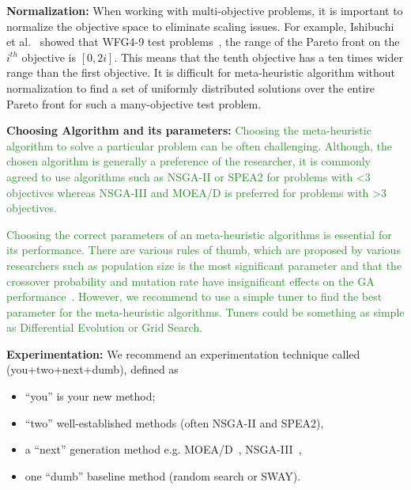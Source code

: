 \documentclass[sigconf,anonymous,review]{acmart}
\newcommand\TODO[1]{\textcolor{ScarletRed}{\textbf{\colorbox{yellow}{\small TODO:}} \emph{#1}}\xspace}
\newcommand\vivek[1]{\textcolor{ForestGreen}{#1\xspace}}
\begin{document}
  \noindent\textbf{Normalization: } When working with multi-objective problems, it is important to normalize the objective space to eliminate scaling issues. For example, Ishibuchi et al.~\cite{ishibuchi2017effect} showed that WFG4-9 test problems~\cite{huband2006review}, the range
of the Pareto front on the $i^{th}$ objective is $[0, 2i]$. This means
that the tenth objective has a ten times wider range than
the first objective. It is difficult for meta-heuristic algorithm without normalization
to find a set of uniformly distributed solutions over the entire Pareto front for such a many-objective test
problem. 

\noindent\textbf{Choosing Algorithm and its parameters: } \vivek{Choosing the meta-heuristic algorithm to solve a particular problem can be often challenging. Although, the chosen algorithm is generally a preference of the researcher, it is commonly agreed to use algorithms such as NSGA-II or SPEA2 for problems with <3 objectives whereas NSGA-III and MOEA/D is preferred for problems with >3 objectives.}

\vivek{Choosing the correct parameters of an meta-heuristic algorithms is essential for its performance. There are various rules of thumb, which are proposed by various researchers such as population size is the most significant parameter and that the crossover probability and mutation rate have insignificant effects on the GA performance~\cite{alajmi2014selecting}. However, we recommend to use a simple tuner to find the best parameter for the meta-heuristic algorithms. Tuners could be something as simple as Differential Evolution or Grid Search. }


 \noindent\textbf{Experimentation: } We recommend an experimentation technique called (you+two+next+dumb),  defined as 
\begin{itemize}
\item ``you'' is your new method;
    \item ``two''  well-established methods (often NSGA-II and SPEA2),
    \item a ``next''  generation method e.g. MOEA/D~\cite{zhang2007moea}, NSGA-III~\cite{deb2014evolutionary},
    \item  one ``dumb'' baseline method (random search or SWAY).
\end{itemize}
\end{document}

